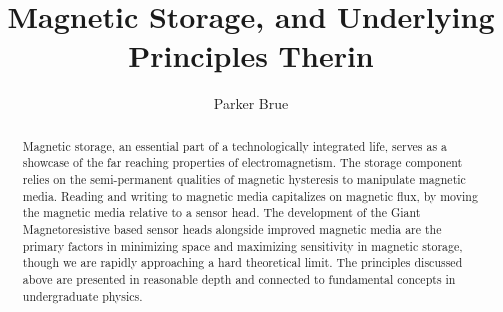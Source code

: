 \documentclass[11pt]{article}
\title{Magnetic Storage, and Underlying Principles Therin}
\author{Parker Brue}
\begin{document}
\maketitle
\begin{abstract}
Magnetic storage, an essential part of a technologically integrated life, serves as a showcase of the far reaching properties of electromagnetism. The storage component relies on the semi-permanent qualities of magnetic hysteresis to manipulate magnetic media. Reading and writing to magnetic media capitalizes on magnetic flux, by moving the magnetic media relative to a sensor head. The development of the Giant Magnetoresistive based sensor heads alongside improved magnetic media are the primary factors in minimizing space and maximizing sensitivity in magnetic storage, though we are rapidly approaching a hard theoretical limit.  The principles discussed above are presented in reasonable depth and connected to fundamental concepts in undergraduate physics.
\end{abstract}
\thispagestyle{fancy}
\end{document}
